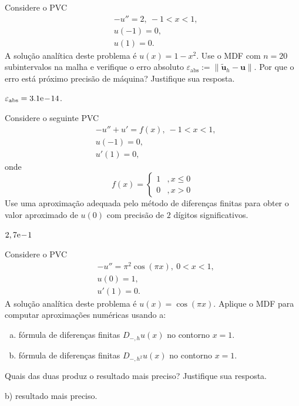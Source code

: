 \begin{exer}
  Considere o PVC
  \begin{align}
    &-u'' = 2, ~-1 < x < 1,\\
    &u(-1) = 0,\\
    &u(1) = 0.
  \end{align}
  A solução analítica deste problema é $u(x) = 1-x^2$. Use o MDF com $n=20$ subintervalos na malha e verifique o erro absoluto $\varepsilon_{\text{abs}} := \|\tilde{\pmb{u}}_h - \pmb{u}\|$. Por que o erro está próximo precisão de máquina? Justifique sua resposta.
\end{exer}
\begin{resp}
  $\varepsilon_{\text{abs}} = 3.1\mathrm{e}\!-\!14$.
\end{resp}

\begin{exer}
Considere o seguinte PVC
\begin{subequations}
  \begin{align}
    &-u'' + u' = f(x), ~-1 < x < 1,\\
    &u(-1) = 0,\\
    &u'(1) =0,
  \end{align}
\end{subequations}
onde
\begin{equation}
  f(x) = \left\{
    \begin{array}{ll}
      1 &, x\leq 0\\
      0 &, x>0
    \end{array}
  \right.
\end{equation}
Use uma aproximação adequada pelo método de diferenças finitas para obter o valor aproximado de $u(0)$ com precisão de $2$ dígitos significativos.
\end{exer}
\begin{resp}
  $2,7\mathrm{e}\!-\!1$
\end{resp}

\begin{exer}
  Considere o PVC
  \begin{align}
    &-u'' = \pi^2\cos(\pi x), ~0 < x < 1,\\
    &u(0) = 1,\\
    &u'(1) = 0.
  \end{align}
  A solução analítica deste problema é $u(x) = \cos(\pi x)$. Aplique o MDF para computar aproximações numéricas usando a:
  \begin{enumerate}[a)]
  \item fórmula de diferenças finitas $D_{-,h}u(x)$ no contorno $x=1$.
  \item fórmula de diferenças finitas $D_{-,h^2}u(x)$ no contorno $x=1$.
  \end{enumerate}
  Quais das duas produz o resultado mais preciso? Justifique sua resposta.
\end{exer}
\begin{resp}
  b) resultado mais preciso.
\end{resp}

